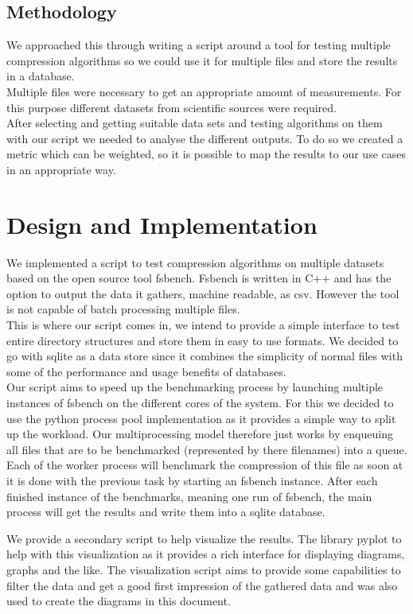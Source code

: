 \documentclass[
	12pt,
	a4paper,
	BCOR10mm,
	DIV14,
	listof=totoc,
	bibliography=totoc,
	headsepline
]{scrreprt}
\begin{document}
\section*{Methodology}
We approached this through writing a script around a tool for testing multiple compression algorithms so we could use it for multiple files and store the results in a database. 
\\
Multiple files were necessary to get an appropriate amount of measurements.
For this purpose different datasets from scientific sources were required.
\\
After selecting and getting suitable data sets and testing algorithms on them with our script we needed to analyse the different outputs.
To do so we created a metric which can be weighted, so it is possible to map the results to our use cases in an appropriate way. \\

\chapter{Design and Implementation}
\label{Design}
We implemented a script to test compression algorithms on multiple datasets based on the open source tool fsbench. 
Fsbench is written in C++ and has the option to output the data it gathers, machine readable, as csv.
However the tool is not capable of batch processing multiple files. \\
This is where our script comes in, we intend to provide a simple interface to test entire directory structures and store them in easy to use formats.
We decided to go with sqlite as a data store since it combines the simplicity of normal files with some of the performance and usage benefits of databases. \\
Our script aims to speed up the benchmarking process by launching multiple instances of fsbench on the different cores of the system.
For this we decided to use the python process pool implementation as it provides a simple way to split up the workload.
Our multiprocessing model therefore just works by enqueuing all files that are to be benchmarked (represented by there filenames) into a queue.
Each of the worker process will benchmark the compression of this file as soon at it is done with the previous task by starting an fsbench instance.
After each finished instance of the benchmarks, meaning one run of fsbench, the main process will get the results and write them into a sqlite database.


We provide a secondary script to help visualize the results. 
The library pyplot to help with this visualization as it provides a rich interface for displaying diagrams, graphs and the like.
The visualization script aims to provide some capabilities to filter the data and get a good first impression of the gathered data and was also used to create the diagrams in this document.
\end{document}
